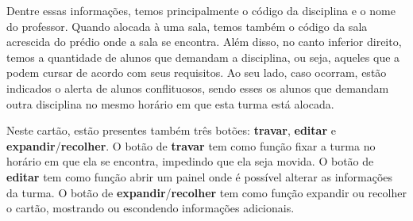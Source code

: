 Dentre essas informações, temos principalmente o código da disciplina e o nome do professor. Quando alocada à uma sala, temos também o código da sala acrescida do prédio onde a sala se encontra. Além disso, no canto inferior direito, temos a quantidade de alunos que demandam a disciplina, ou seja, aqueles que a podem cursar de acordo com seus requisitos. Ao seu lado, caso ocorram, estão indicados o alerta de alunos conflituosos, sendo esses os alunos que demandam outra disciplina no mesmo horário em que esta turma está alocada.

Neste cartão, estão presentes também três botões: \textbf{travar}, \textbf{editar} e \textbf{expandir}/\textbf{recolher}. O botão de \textbf{travar} tem como função fixar a turma no horário em que ela se encontra, impedindo que ela seja movida. O botão de \textbf{editar} tem como função abrir um painel onde é possível alterar as informações da turma. O botão de \textbf{expandir}/\textbf{recolher} tem como função expandir ou recolher o cartão, mostrando ou escondendo informações adicionais.

